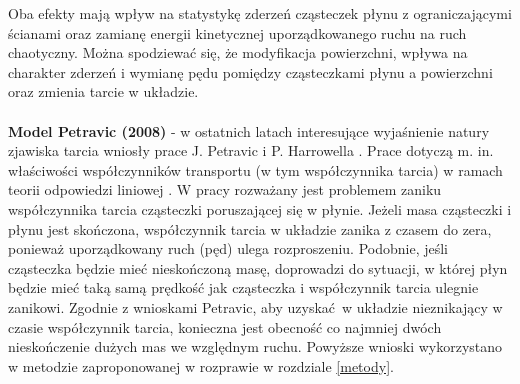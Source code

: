 \documentclass[12pt,a4paper,openright]{report} %
\begin{document}
Oba efekty mają wpływ na statystykę zderzeń cząsteczek płynu z ograniczającymi ścianami oraz zamianę energii kinetycznej uporządkowanego ruchu na ruch chaotyczny. Można spodziewać się, że modyfikacja powierzchni, wpływa na charakter zderzeń i wymianę pędu pomiędzy cząsteczkami płynu a powierzchni oraz zmienia tarcie w układzie. 
\\
\\
\textbf{Model Petravic (2008)} - w ostatnich latach interesujące wyjaśnienie natury zjawiska tarcia wniosły prace J. Petravic i P. Harrowella \cite{Petravic2, PetravicHarrowell2006, Petravic2006-2, Petravic2005}. Prace dotyczą m. in. właściwości współczynników transportu (w tym współczynnika tarcia) w ramach teorii odpowiedzi liniowej \cite{EvansMoris1990}. W pracy \cite{Petravic2} rozważany jest problemem zaniku współczynnika tarcia cząsteczki poruszającej się w płynie. Jeżeli masa cząsteczki i płynu jest skończona, współczynnik tarcia w układzie zanika z czasem do zera, ponieważ uporządkowany ruch (pęd) ulega rozproszeniu. Podobnie, jeśli cząsteczka będzie mieć nieskończoną masę, doprowadzi do sytuacji, w której płyn będzie mieć taką samą prędkość jak cząsteczka i współczynnik tarcia ulegnie zanikowi. Zgodnie z wnioskami Petravic, aby uzyskać~w układzie nieznikający w czasie współczynnik tarcia, konieczna jest obecność co najmniej dwóch nieskończenie dużych mas we względnym ruchu. Powyższe wnioski wykorzystano w metodzie zaproponowanej w rozprawie w rozdziale \ref{metody}.
%
\end{document}
